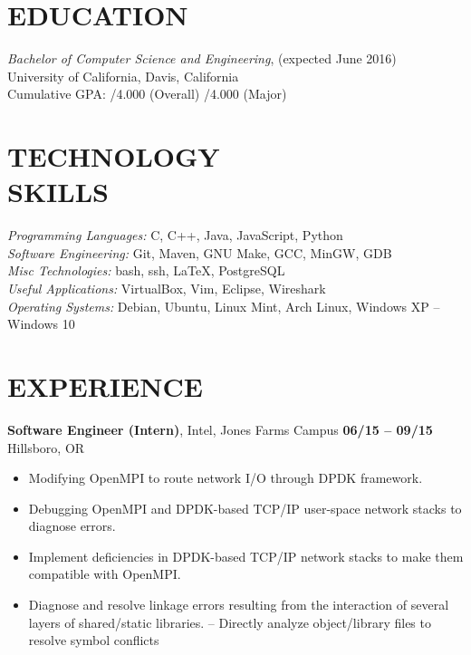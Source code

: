 \documentclass[line, letterpaper, 10pt]{res}
\begin{document}
\address{jmmcgee@ucdavis.edu | (323) 557-8647}

\begin{resume}


\section{EDUCATION}
    {\sl Bachelor of Computer Science and Engineering}, (expected June 2016) \\
    University of California, Davis, California \\
    Cumulative GPA: /4.000 (Overall) /4.000 (Major)

\section{TECHNOLOGY \\ SKILLS}
    {\sl Programming Languages:}  C, C++, Java, JavaScript, Python \\
    {\sl Software Engineering:} Git, Maven, GNU Make, GCC, MinGW, GDB \\
    {\sl Misc Technologies:} bash, ssh, LaTeX, PostgreSQL \\
    {\sl Useful Applications:} VirtualBox, Vim, Eclipse, Wireshark \\
    {\sl Operating Systems:} Debian, Ubuntu, Linux Mint, Arch Linux, Windows XP -- Windows 10

\section{EXPERIENCE}

    {\bf Software Engineer (Intern)}, Intel, Jones Farms Campus \hfill {\bf 06/15 -- 09/15} \\
    Hillsboro, OR
    \begin{itemize} \itemsep -2pt
        \item Modifying OpenMPI to route network I/O through DPDK framework.
        \item Debugging OpenMPI and DPDK-based TCP/IP user-space network stacks to diagnose errors.
        \item Implement deficiencies in DPDK-based TCP/IP network stacks to make them compatible with OpenMPI.
        \item Diagnose and resolve linkage errors resulting from the interaction of several layers of shared/static libraries.
            \subitem -- Directly analyze object/library files to resolve symbol conflicts
    \end{itemize}


\end{resume}
\end{document}
